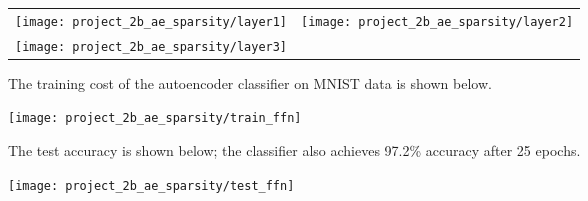 \begin{longtabu}{X[c]X[c]}
    \texttt{[image: project\_2b\_ae\_sparsity/layer1]} &
    \texttt{[image: project\_2b\_ae\_sparsity/layer2]} \\
    \texttt{[image: project\_2b\_ae\_sparsity/layer3]}
\end{longtabu}

The training cost of the autoencoder classifier on MNIST data is shown below.

\begin{center}
    \texttt{[image: project\_2b\_ae\_sparsity/train\_ffn]}
\end{center}

The test accuracy is shown below; the classifier also achieves 97.2\% accuracy
after 25 epochs.

\begin{center}
    \texttt{[image: project\_2b\_ae\_sparsity/test\_ffn]}
\end{center}